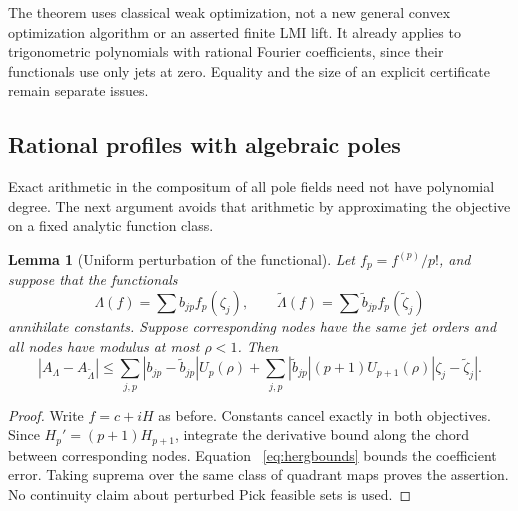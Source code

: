 \documentclass[11pt,a4paper]{article}
\newtheorem{lemma}[theorem]{Lemma}
\theoremstyle{remark}\newtheorem{remark}[theorem]{Remark}
\begin{document}
The theorem uses classical weak optimization, not a new general
convex optimization algorithm or an asserted finite LMI lift.
It already applies to trigonometric polynomials with rational Fourier
coefficients, since their functionals use only jets at zero.
Equality and the size of an explicit certificate remain separate issues.

\subsection{Rational profiles with algebraic poles}
Exact arithmetic in the compositum of all pole fields need not have
polynomial degree. The next argument avoids that arithmetic by
approximating the objective on a fixed analytic function class.

\begin{lemma}[Uniform perturbation of the functional]\label{lem:perturb}
Let \(f_p=f^{(p)}/p!\), and suppose that the functionals
\[
 \Lambda(f)=\sum b_{jp}f_p(\zeta_j),\qquad
 \widetilde\Lambda(f)=\sum\widetilde b_{jp}f_p(\widetilde\zeta_j)
\]
annihilate constants. Suppose corresponding
nodes have the same jet orders and all nodes have modulus at most
\(\rho<1\). Then
\[
 |A_\Lambda-A_{\widetilde\Lambda}|\leq
 \sum_{j,p}|b_{jp}-\widetilde b_{jp}|U_p(\rho)
 +\sum_{j,p}|\widetilde b_{jp}|(p+1)U_{p+1}(\rho)
 |\zeta_j-\widetilde\zeta_j|.
\]
\end{lemma}
\begin{proof}
Write \(f=c+iH\) as before. Constants cancel exactly in both
objectives. Since \(H_p'=(p+1)H_{p+1}\), integrate the derivative
bound along the chord between corresponding nodes. Equation~
\eqref{eq:hergbounds} bounds the coefficient error. Taking suprema
over the same class of quadrant maps proves the assertion.
No continuity claim about perturbed Pick feasible sets is used.
\end{proof}
\end{document}
